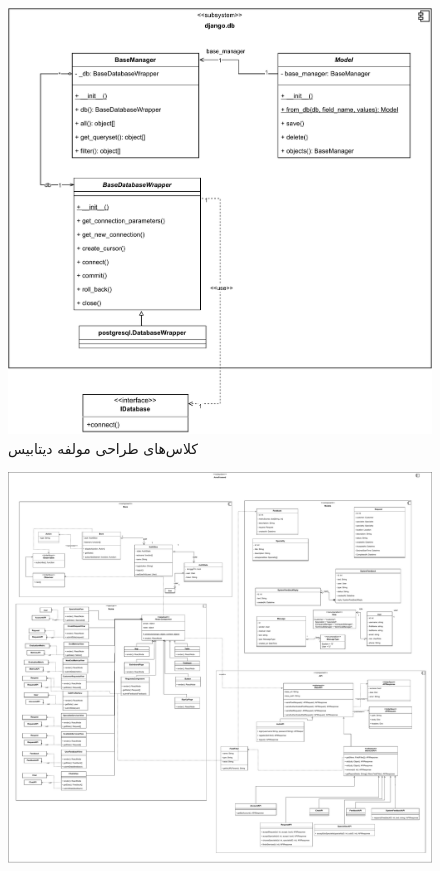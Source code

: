 \recalctypearea

\begin{figure}[ht!]
	\centering
	\includegraphics[scale=0.8]{figs/design-class/db.pdf}
	\caption{کلاس‌های طراحی مولفه دیتابیس}
\end{figure}
\FloatBarrier
\newpage

\eject \pdfpagewidth=25in \pdfpageheight=25in

\begin{figure}[ht!]
	\centering
	\includegraphics[scale=0.8]{figs/design-class/front.pdf}
\end{figure}
\FloatBarrier
\newpage

